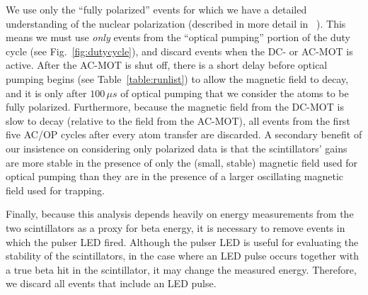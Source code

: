 We use only the ``fully polarized'' events for which we have a detailed understanding of the nuclear polarization (described in more detail in ~\cite{ben_OP}).  This means we must use \emph{only} events from the ``optical pumping'' portion of the duty cycle (see Fig.~\ref{fig:dutycycle}), and discard events when the DC- or AC-MOT is active.  After the AC-MOT is shut off, there is a short delay before optical pumping begins (see Table~\ref{table:runlist}) to allow the magnetic field to decay, and it is only after $100\,\mu s$ of optical pumping that we consider the atoms to be fully polarized.  Furthermore, because the magnetic field from the DC-MOT is slow to decay (relative to the field from the AC-MOT), all events from the first five AC/OP cycles after every atom transfer are discarded.  A secondary benefit of our insistence on considering only polarized data is that the scintillators' gains are more stable in the presence of only the (small, stable) magnetic field used for optical pumping than they are in the presence of a larger oscillating magnetic field used for trapping.

Finally, because this analysis depends heavily on energy measurements from the two scintillators as a proxy for beta energy, it is necessary to remove events in which the pulser LED fired.  Although the pulser LED is useful for evaluating the stability of the scintillators, in the case where an LED pulse occurs together with a true beta hit in the scintillator, it may change the measured energy.  Therefore, we discard all events that include an LED pulse.   
	

